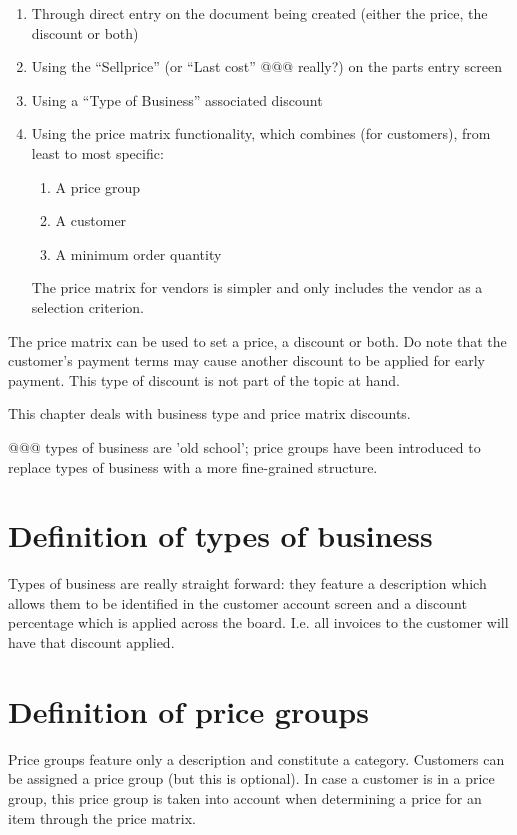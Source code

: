 \begin{enumerate}
	\item Through direct entry on the document being created (either the price, the discount or both)
	\item Using the ``Sellprice'' (or ``Last cost'' @@@ really?) on the parts entry screen
	\item Using a ``Type of Business'' associated discount
	\item Using the price matrix functionality, which combines (for customers), from least to most specific:
		\begin{enumerate}
			\item A price group
			\item A customer
			\item A minimum order quantity
		\end{enumerate}
		The price matrix for vendors is simpler and only includes the vendor as a selection criterion.
\end{enumerate}

The price matrix can be used to set a price, a discount or both.  Do note that the \gls{customer}'s payment
terms may cause another discount to be applied for early payment.  This type of discount is not part of the
topic at hand. 

This chapter deals with business type and price matrix discounts.

@@@ types of business are 'old school'; price groups have been introduced to replace types of business with a more fine-grained structure.

\section{Definition of types of business}
\label{sec-pricing-business-types}

Types of business are really straight forward: they feature a description
which allows them to be identified in the \gls{customer} account screen and a discount
percentage which is applied across the board. I.e. all invoices to the customer
will have that discount applied.

\section{Definition of price groups}
\label{sec-pricing-price-groups}

Price groups feature only a description and constitute a category. Customers can be assigned a price group
(but this is optional). In case a customer is in a price group, this price group is taken into account when
determining a price for an item through the price matrix.

